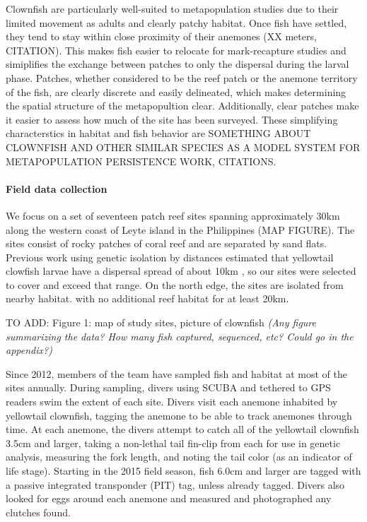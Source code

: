 \documentclass[12pt, oneside]{article}   	%
\begin{document}

Clownfish are particularly well-suited to metapopulation studies due to their limited movement as adults and clearly patchy habitat. Once fish have settled, they tend to stay within close proximity of their anemones (XX meters, CITATION). This makes fish easier to relocate for mark-recapture studies and simiplifies the exchange between patches to only the dispersal during the larval phase. Patches, whether considered to be the reef patch or the anemone territory of the fish, are clearly discrete and easily delineated, which makes determining the spatial structure of the metapopultion clear. Additionally, clear patches make it easier to assess how much of the site has been surveyed. These simplifying characterstics in habitat and fish behavior are SOMETHING ABOUT CLOWNFISH AND OTHER SIMILAR SPECIES AS A MODEL SYSTEM FOR METAPOPULATION PERSISTENCE WORK, CITATIONS.

\paragraph*{Field data collection}

We focus on a set of seventeen patch reef sites spanning approximately 30km along the western coast of Leyte island in the Philippines (MAP FIGURE). The sites consist of rocky patches of coral reef and are separated by sand flats. Previous work using genetic isolation by distances estimated that yellowtail clowfish larvae have a dispersal spread of about 10km \citep{pinsky2010using}, so our sites were selected to cover and exceed that range. On the north edge, the sites are isolated from nearby habitat. with no additional reef habitat for at least 20km. %

TO ADD: Figure 1: map of study sites, picture of clownfish
\textit{(Any figure summarizing the data? How many fish captured, sequenced, etc? Could go in the appendix?)}

Since 2012, members of the team have sampled fish and habitat at most of the sites annually. During sampling, divers using SCUBA and tethered to GPS readers swim the extent of each site. Divers visit each anemone inhabited by yellowtail clownfish, tagging the anemone to be able to track anemones through time. At each anemone, the divers attempt to catch all of the yellowtail clownfish 3.5cm and larger, taking a non-lethal tail fin-clip from each for use in genetic analysis, measuring the fork length, and noting the tail color (as an indicator of life stage). Starting in the 2015 field season, fish 6.0cm and larger are tagged with a passive integrated transponder (PIT) tag, unless already tagged. Divers also looked for eggs around each anemone and measured and photographed any clutches found.
\end{document}
